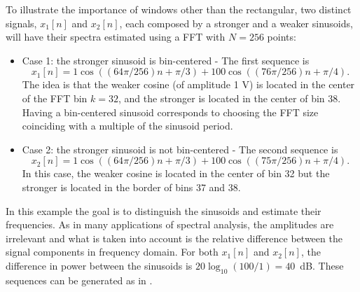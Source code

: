 To illustrate the importance of windows other than the rectangular, two distinct signals, $x_1[n]$ and $x_2[n]$, each composed by a stronger and a weaker sinusoids, will have their spectra estimated using a FFT with $N=256$ points:
\begin{itemize}
\item Case 1: the stronger sinusoid is bin-centered - The first sequence is
\[
x_1[n] = 1 \cos( (64\pi/256) n + \pi/3) + 100 \cos( (76\pi/256) n + \pi/4).
\]
The idea is that the weaker cosine (of amplitude 1 V) is located in the center of the FFT bin $k=32$, and the stronger is located in the center of bin 38. Having a bin-centered sinusoid corresponds to choosing the FFT size coinciding with a multiple of the sinusoid period.

\item Case 2: the stronger sinusoid is not bin-centered - The second sequence is
\[
x_2[n] = 1 \cos( (64\pi/256) n + \pi/3) + 100 \cos( (75\pi/256) n + \pi/4).
\]
In this case, the weaker cosine is located in the center of bin 32 but the stronger is located in the border of bins 37 and 38.
\end{itemize}
In this example the goal is to distinguish the sinusoids and estimate their frequencies. As in many applications of spectral analysis, the amplitudes are irrelevant and what is taken into account is the relative difference between the signal components in frequency domain. For both $x_1[n]$ and $x_2[n]$, the difference in power between the sinusoids is $20 \log_{10}(100/1) = 40$~dB. These sequences can be generated as in .


